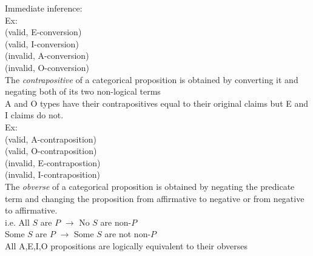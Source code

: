 Immediate inference:\\
Ex:\\
 (valid, E-conversion)\\
 (valid, I-conversion)\\
 (invalid, A-conversion)\\
 (invalid, O-conversion)\\

The \textit{contrapositive} of a categorical proposition is obtained by converting it and negating both of its two non-logical terms\\
A and O types have their contrapositives equal to their original claims but E and I claims do not.\\

Ex:\\
 (valid, A-contraposition)\\
 (valid, O-contraposition)\\
 (invalid, E-contrapostion)\\
 (invalid, I-contraposition)\\

The \textit{obverse} of a categorical proposition is obtained by negating the predicate term and changing the proposition from affirmative to negative or from negative to affirmative.\\
i.e. All $S$ are $P$ $\to$ No $S$ are non-$P$\\
Some $S$ are $P$ $\to$ Some $S$ are not non-$P$\\
All A,E,I,O propositions are logically equivalent to their obverses\\

